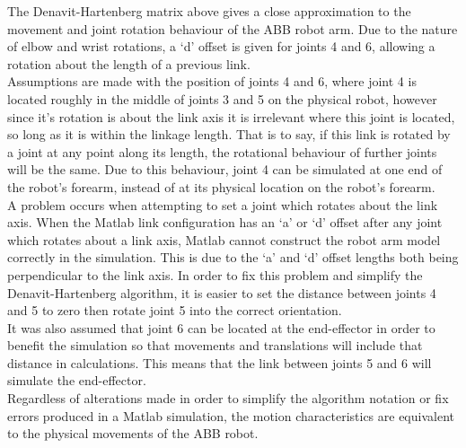 \documentclass[11pt,a4paper, margin=1in]{report}
\begin{document}
The Denavit-Hartenberg matrix above gives a close approximation to the movement and joint rotation behaviour of the ABB robot arm. Due to the nature of elbow and wrist rotations, a `d' offset is given for joints 4 and 6, allowing a rotation about the length of a previous link.\\
Assumptions are made with the position of joints 4 and 6, where joint 4 is located roughly in the middle of joints 3 and 5 on the physical robot, however since it's rotation is about the link axis it is irrelevant where this joint is located, so long as it is within the linkage length. That is to say, if this link is rotated by a joint at any point along its length, the rotational behaviour of further joints will be the same. Due to this behaviour, joint 4 can be simulated at one end of the robot's forearm, instead of at its physical location on the robot's forearm.\\
A problem occurs when attempting to set a joint which rotates about the link axis. When the Matlab link configuration has an `a' or `d' offset after any joint which rotates about a link axis, Matlab cannot construct the robot arm model correctly in the simulation. This is due to the `a' and `d' offset lengths both being perpendicular to the link axis. In order to fix this problem and simplify the Denavit-Hartenberg algorithm, it is easier to set the distance between joints 4 and 5 to zero then rotate joint 5 into the correct orientation.\\
It was also assumed that joint 6 can be located at the end-effector in order to benefit the simulation so that movements and translations will include that distance in calculations. This means that the link between joints 5 and 6 will simulate the end-effector.\\
Regardless of alterations made in order to simplify the algorithm notation or fix errors produced in a Matlab simulation, the motion characteristics are equivalent to the physical movements of the ABB robot.
\end{document}
